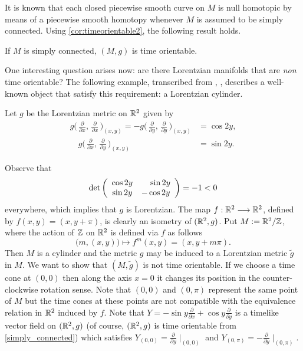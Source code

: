 It is known that each closed piecewise smooth curve on $M$ is null homotopic by means of a piecewise smooth homotopy whenever $M$ is assumed to be simply connected. Using \autoref{cor:timeorientable2}, the following result holds.

\begin{corollary}
	If $M$ is simply connected, $(M,g)$ is time orientable.
\end{corollary}

One interesting question arises now: are there Lorentzian manifolds that are \emph{non} time orientable? The following example, transcribed from \cite[Example 3.5]{romero10}, \cite[Example 1.2.3]{sachs77}, describes a well-known object that satisfy this requirement: a Lorentzian cylinder.

\begin{example}
	Let $g$ be the Lorentzian metric on $\mathbb{R}^2$ given by
	\begin{align*}
		g\Big(\,\frac{\partial}{\partial x},\,\frac{\partial}{\partial x}\,\Big)_{(x,y)}=-g\Big(\,\frac{\partial}{\partial y},\,\frac{\partial}{\partial y}\,\Big)_{(x,y)} &= \cos 2y,\\
		\quad g\Big(\,\frac{\partial}{\partial x},\,\frac{\partial}{\partial y}\,\Big)_{(x,y)}&= \sin 2y.
	\end{align*}
	
	Observe that
	\[
		\mathrm{det}\left(
			\begin{array}{cc}
			\cos 2y & \hspace*{4mm}\sin 2y  \\
			\sin 2y & -\cos 2y
		\end{array} \right) = -1 < 0
	\]
	everywhere, which implies that $g$ is Lorentzian. The map $f : \mathbb{R}^2 \longrightarrow \mathbb{R}^2$, defined by $f(x,y)=(x,y+\pi)$, is clearly an isometry of $(\mathbb{R}^2,g)$. Put $M:=\mathbb{R}^2 / {\mathbb Z}$, where the action of ${\mathbb Z}$ on $\mathbb{R}^2$ is defined via $f$ as follows
	\[
		\big(m,(x,y)\big) \mapsto f^m(x,y)=(x,y+m\pi).
	\]
	Then $M$ is a cylinder and the metric $g$ may be induced to a Lorentzian metric ${\tilde g}$ in $M$. We want to show that $(M,{\tilde g})$ is not time orientable. If we choose a time cone at $(0,0)$ then along the axis $x=0$ it changes its position in the counter-clockwise rotation sense. Note that $(0,0)$ and $(0,\pi)$ represent the same point of $M$ but the time cones at these points are not compatible with the equivalence relation in $\mathbb{R}^2$ induced by $f$. Note that $Y=-\sin y \frac{\partial}{\partial x} + \cos y \frac{\partial}{\partial y}$ is a timelike vector field on $(\mathbb{R}^2,g)$ (of course, $(\mathbb{R}^2,g)$ is time orientable from \autoref{simply_connected}) which satisfies $Y_{(0,0)}=\frac{\partial}{\partial y}\mid_{(0,0)}$ and $Y_{(0,\pi)}=-\frac{\partial}{\partial y}\mid_{(0,\pi)}$.
	

\end{example}
